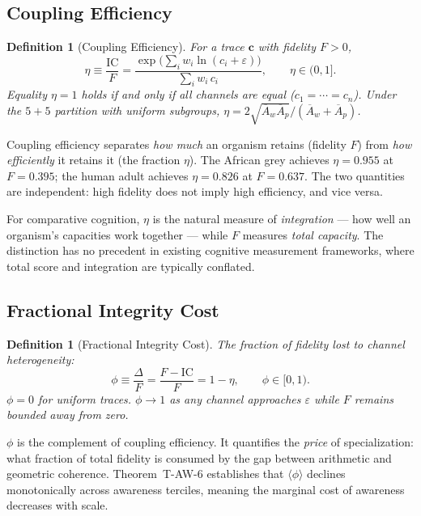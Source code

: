 \documentclass[
  aps,
  prd,
  twocolumn,
  superscriptaddress,
  nofootinbib,
  floatfix
]{revtex4-2}
\newtheorem{definition}[theorem]{Definition}
\newcommand{\eps}{\varepsilon}
\newcommand{\beq}{\begin{equation}}
\newcommand{\eeq}{\end{equation}}
\newcommand{\tvec}{\mathbf{c}}
\newcommand{\IC}{\mathrm{IC}}
\newcommand{\Aw}{\overline{A}_{\!w}}
\newcommand{\Ap}{\overline{A}_{\!p}}
\begin{document}
\subsection{Coupling Efficiency}

\begin{definition}[Coupling Efficiency]\label{def:eta}
For a trace $\tvec$ with fidelity $F > 0$,
\beq\label{eq:eta}
  \eta \equiv \frac{\IC}{F}
    = \frac{\exp\!\bigl(\sum_i w_i\ln(c_i+\eps)\bigr)}
           {\sum_i w_i\, c_i},
  \qquad \eta \in (0, 1].
\eeq
Equality $\eta = 1$ holds if and only if all channels
are equal ($c_1 = \cdots = c_n$).  Under the $5\!+\!5$
partition with uniform subgroups,
$\eta = 2\sqrt{\Aw\Ap}/(\Aw + \Ap)$.
\end{definition}

Coupling efficiency separates \emph{how much} an organism
retains (fidelity $F$) from \emph{how efficiently} it retains
it (the fraction $\eta$).  The African grey achieves
$\eta = 0.955$ at $F = 0.395$; the human adult achieves
$\eta = 0.826$ at $F = 0.637$.  The two quantities are
independent: high fidelity does not imply high efficiency,
and vice versa.

For comparative cognition, $\eta$ is the natural measure of
\emph{integration} --- how well an organism's capacities
work together --- while $F$ measures \emph{total capacity}.
The distinction has no precedent in existing cognitive
measurement frameworks, where total score and integration
are typically conflated.

\subsection{Fractional Integrity Cost}

\begin{definition}[Fractional Integrity Cost]\label{def:deltaf}
The fraction of fidelity lost to channel heterogeneity:
\beq\label{eq:deltaf}
  \phi \equiv \frac{\Delta}{F}
    = \frac{F - \IC}{F}
    = 1 - \eta,
  \qquad \phi \in [0, 1).
\eeq
$\phi = 0$ for uniform traces.  $\phi \to 1$ as any
channel approaches $\eps$ while $F$ remains bounded
away from zero.
\end{definition}

$\phi$ is the complement of coupling efficiency.  It
quantifies the \emph{price} of specialization: what
fraction of total fidelity is consumed by the gap between
arithmetic and geometric coherence.  Theorem~T-AW-6
establishes that $\langle\phi\rangle$ declines
monotonically across awareness terciles, meaning the
marginal cost of awareness decreases with scale.
\end{document}
